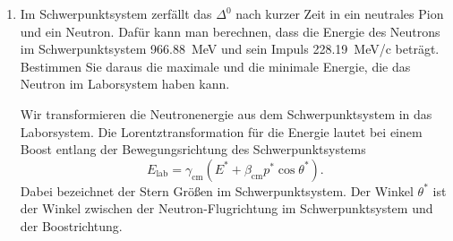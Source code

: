 \documentclass[11pt,a4paper]{scrartcl}
\begin{document}
\begin{enumerate}[label=(\alph*)]
\begin{calculationbox}
                \begin{calculationbox}
                    Also
                    \begin{align*}
                        p_{\pi,\mathrm{thr}}
                        &=\sqrt{E_{\pi,\mathrm{thr}}^2-m_{\pi}^2}\\
                        &=\sqrt{(329.28)^2-(139.6)^2}\,\si{MeV}\\
                        &=\SI{298.22}{MeV}.
                    \end{align*}
                    Damit ist
                    \begin{align*}
                        \beta_{\mathrm{cm}}
                        &=\frac{298.22}{329.28+938.3}\\
                        &=0.23527.
                    \end{align*}
                \end{calculationbox}
            \end{calculationbox}

            \begin{answerbox}
                Das Schwerpunktsystem bewegt sich relativ zum Laborsystem mit
                \[
                    \boxed{\beta_{\mathrm{cm}}=0.24}
                \]
                beziehungsweise genauer mit
                \[
                    \boxed{v_{\mathrm{cm}}=0.23527\,c.}
                \]
            \end{answerbox}

        \item
            Im Schwerpunktsystem zerfällt das $\Delta^0$ nach kurzer Zeit in ein neutrales Pion
            und ein Neutron. Dafür kann man berechnen, dass die Energie des Neutrons im
            Schwerpunktsystem \SI{966.88}{MeV} und sein Impuls \SI{228.19}{MeV/c} beträgt.
            Bestimmen Sie daraus die maximale und die minimale Energie, die das Neutron
            im Laborsystem haben kann.

            \begin{calculationbox}
                Wir transformieren die Neutronenergie aus dem Schwerpunktsystem in das Laborsystem.
                Die Lorentztransformation für die Energie lautet bei einem Boost entlang der
                Bewegungsrichtung des Schwerpunktsystems
                \[
                    E_{\mathrm{lab}}=\gamma_{\mathrm{cm}}
                    \left(E^*+\beta_{\mathrm{cm}}p^*\cos\theta^*\right).
                \]
                Dabei bezeichnet der Stern Größen im Schwerpunktsystem. Der Winkel $\theta^*$ ist
                der Winkel zwischen der Neutron-Flugrichtung im Schwerpunktsystem und der Boostrichtung.


\end{calculationbox}
\end{enumerate}
\end{document}
